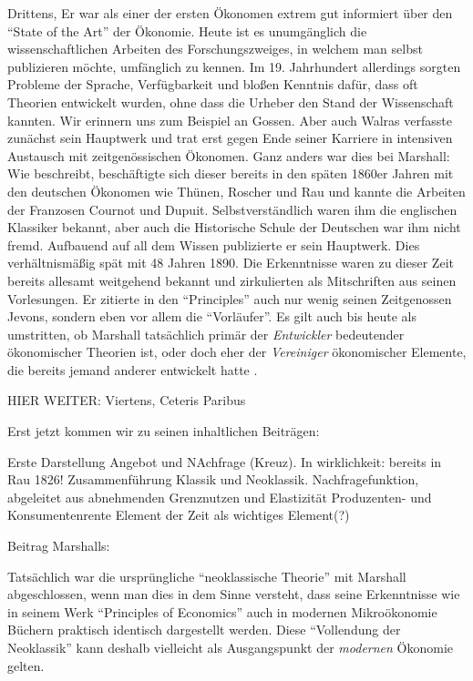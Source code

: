 Drittens, Er war als einer der ersten Ökonomen extrem gut informiert über den "`State of the Art"' der Ökonomie. Heute ist es unumgänglich die wissenschaftlichen Arbeiten des Forschungszweiges, in welchem man selbst publizieren möchte, umfänglich zu kennen. Im 19. Jahrhundert allerdings sorgten Probleme der Sprache, Verfügbarkeit und bloßen Kenntnis dafür, dass oft Theorien entwickelt wurden, ohne dass die Urheber den Stand der Wissenschaft kannten. Wir erinnern uns zum Beispiel an Gossen. Aber auch Walras verfasste zunächst sein Hauptwerk und trat erst gegen Ende seiner Karriere in intensiven Austausch mit zeitgenössischen Ökonomen. Ganz anders war dies bei Marshall: Wie \textcite{Groenewegen1995} beschreibt, beschäftigte sich dieser bereits in den späten 1860er Jahren mit den deutschen Ökonomen wie Thünen, Roscher und Rau und kannte die Arbeiten der Franzosen Cournot und Dupuit. Selbstverständlich waren ihm die englischen Klassiker bekannt, aber auch die Historische Schule der Deutschen war ihm nicht fremd. Aufbauend auf all dem Wissen publizierte er sein Hauptwerk. Dies verhältnismäßig spät mit 48 Jahren 1890. Die Erkenntnisse waren zu dieser Zeit bereits allesamt weitgehend bekannt und zirkulierten als Mitschriften aus seinen Vorlesungen. Er zitierte in den "`Principles"' auch nur wenig seinen Zeitgenossen Jevons, sondern eben vor allem die "`Vorläufer"'. Es gilt auch bis heute als umstritten, ob Marshall tatsächlich primär der \textit{Entwickler} bedeutender ökonomischer Theorien ist, oder doch eher der \textit{Vereiniger} ökonomischer Elemente, die bereits jemand anderer entwickelt hatte \parencite[S. 207ff]{Ekelund2002}. 

HIER WEITER: 
Viertens, Ceteris Paribus

Erst jetzt kommen wir zu seinen inhaltlichen Beiträgen:
 
Erste Darstellung Angebot und NAchfrage (Kreuz). In wirklichkeit: bereits in Rau 1826! \textcite[S. 159]{Blaug2001}
Zusammenführung Klassik und Neoklassik. Nachfragefunktion, abgeleitet aus abnehmenden Grenznutzen und 
Elastizität
Produzenten- und Konsumentenrente
Element der Zeit als wichtiges Element(?)


Beitrag Marshalls: \textcite{Ekelund2002}


Tatsächlich war die ursprüngliche "`neoklassische Theorie"' mit Marshall abgeschlossen, wenn man dies in dem Sinne versteht, dass seine Erkenntnisse wie in seinem Werk "`Principles of Economics"' auch in modernen Mikroökonomie Büchern praktisch identisch dargestellt werden. Diese "`Vollendung der Neoklassik"' kann deshalb vielleicht als Ausgangspunkt der \textit{modernen} Ökonomie gelten. 


